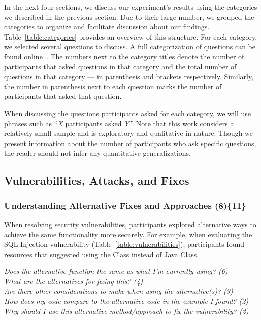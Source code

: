 \documentclass{acm_proc_article-sp}
\begin{document}
In the next four sections, we discuss our experiment's results using the categories we described in the previous section.
Due to their large number, we grouped the categories to organize and facilitate discussion about our findings. 
Table~\ref{table:categories} provides an overview of this structure.
For each category, we selected several questions to discuss. A full categorization of questions can be found online~\cite{ExperimentalMaterials}.
The numbers next to the category titles denote the number of participants that asked questions in that category and the total number of questions in that category --- in parenthesis and brackets respectively. Similarly, the number in parenthesis next to each question marks the number of participants that asked that question.

When discussing the questions participants asked for each category, we will use phrases such as ``\emph{X} participants asked \emph{Y}.''
Note that this work considers a relatively small sample and is exploratory and qualitative in nature.
Though we present information about the number of participants who ask specific questions, the reader should not infer any quantitative generalizations.

\subsection{Vulnerabilities, Attacks, and Fixes}
\label{sec:results-vaf}



\subsubsection{\textbf{Understanding Alternative Fixes and Approaches (8)\{11\}}}\label{uafa}

When resolving security vulnerabilities, participants explored alternative ways to achieve the same functionality more securely.
For example, when evaluating the SQL Injection vulnerability (Table~\ref{table:vulnerabilities}), participants found resources that suggested using the  Class instead of Java  Class. 

\noindent\emph{Does the alternative function the same as what I'm currently using? (6)} \\
\emph{What are the alternatives for fixing this? (4)} \\
\emph{Are there other considerations to make when using the alternative(s)? (3)} \\
\emph{How does my code compare to the alternative code in the example I found? (2)} \\
\emph{Why should I use this alternative method/approach to fix the vulnerability? (2)} 
\end{document}
